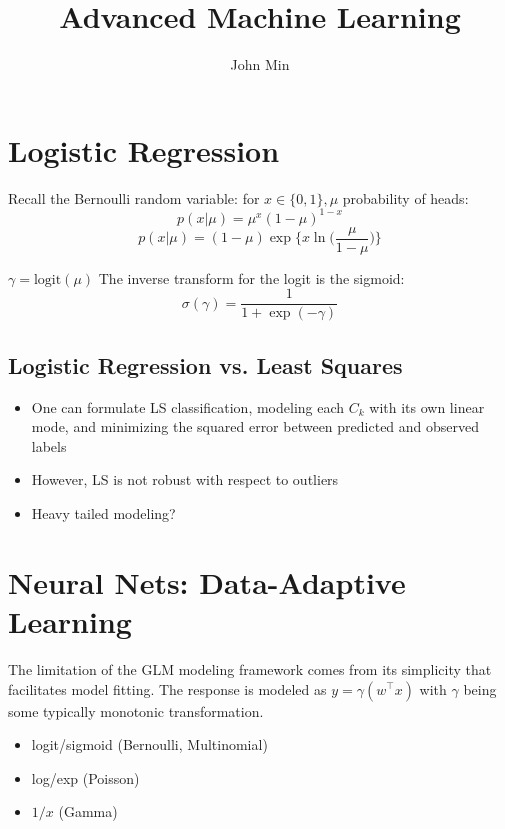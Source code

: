 \documentclass[a4, 10pt]{article}
\title{Advanced Machine Learning}
\author{John Min}
\begin{document}
\maketitle

\section{Logistic Regression}

Recall the Bernoulli random variable:  for $x \in \{0,1\}, \mu$ probability of heads: \\
$$p(x|\mu) = \mu^x (1-\mu)^{1-x}$$
$$p(x|\mu) = (1-\mu) \exp \bigg\{x \ln \Big( \frac{\mu}{1-\mu} \Big) \bigg\} $$    

\noindent
$\gamma = \text{logit}(\mu)$
The inverse transform for the logit is the sigmoid: \\
$$ \sigma(\gamma) = \frac{1}{1+ \exp(- \gamma)} $$

	\subsection{Logistic Regression vs. Least Squares}

\begin{itemize}
	\item One can formulate LS classification, modeling each $C_k$ with its own linear mode, and minimizing the squared error between predicted and observed labels
	\item However, LS is not robust with respect to outliers
	\item Heavy tailed modeling?
\end{itemize}

\newpage

\section{Neural Nets:  Data-Adaptive Learning}
The limitation of the GLM modeling framework comes from its simplicity that facilitates model fitting.  The response is modeled as $y = \gamma (w^\top x) $ with $\gamma$ being some typically monotonic transformation.

\begin{itemize}
	\item logit/sigmoid (Bernoulli, Multinomial)
	\item log/exp (Poisson)
	\item $1/x$ (Gamma)
\end{itemize} 
\end{document}
